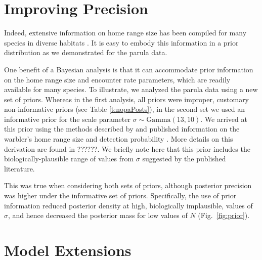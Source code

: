 

\section{Improving Precision}
\label{unmarked.sec.precision}



Indeed, extensive information on home range size has
been compiled for many species in diverse habitats %
\citep[\emph{e.g.},][]{degraaf_yamasaki:2001}. It is
easy to embody this information in a prior distribution as we
demonstrated for the parula data.


One benefit of a Bayesian analysis is that it can accommodate prior
information on the home range size and encounter rate parameters,
which are readily available for many
species. To illustrate, we analyzed the parula data using a new set of
priors. Whereas in the first analysis, all priors were
improper, customary non-informative priors (see Table \ref{t:nopaPosts}),
in the second set we used
an informative prior for the scale parameter $\sigma \sim
\mbox{Gamma}(13,10)$. We arrived at this prior using the methods
described by \citet{royle_etal:2011mee} and published
information on the warbler's home range size and detection probability
\citep{moldenhaer_regelski:1996,simons_etal:2009}. More details on this
derivation are found in ??????. We briefly note here that this prior
includes the biologically-plausible range of values from $\sigma$
suggested by the published literature.


This was true when considering
both sets of priors, although posterior precision was higher under the
informative set of priors. Specifically, the use of prior information
reduced posterior density at high, biologically implausible,
values of $\sigma$, and hence decreased the posterior mass for
low values of $N$ (Fig.~\ref{fig:prior}).




\section{Model Extensions}
\label{unmarked.ext}

